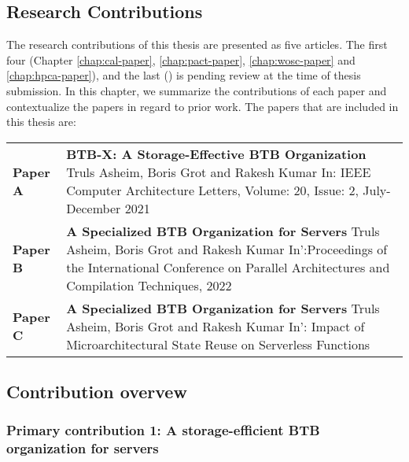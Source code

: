 \documentclass[../main.tex]{subfiles}
\begin{document}
\ifx\chapincluded\undefined
  \begin{refsection}
 \fi

\chapter{Research Contributions}

The research contributions of this thesis are presented as five articles. The first four (Chapter \ref{chap:cal-paper}, \ref{chap:pact-paper}, \ref{chap:wosc-paper} and \ref{chap:hpca-paper}), and the last () is pending review at the time of thesis submission. In this chapter, we summarize the contributions of each paper and contextualize the papers in regard to prior work. The papers that are included in this thesis are:

\vspace*{0.8cm}

\noindent
\begin{tabular}{lp{}}
\textbf{Paper A} & \textbf{BTB-X: A Storage-Effective BTB Organization} \newline
                     Truls Asheim, Boris Grot and Rakesh Kumar \newline
                     In: IEEE Computer Architecture Letters, Volume: 20, Issue: 2, July-December 2021
                     \vspace*{0.3cm} \\
\textbf{Paper B} & \textbf{A Specialized BTB Organization for Servers} \newline
                     Truls Asheim, Boris Grot and Rakesh Kumar \newline
                     In':Proceedings of the International Conference on Parallel Architectures and Compilation Techniques, 2022
                     \vspace*{0.3cm} \\
\textbf{Paper C} & \textbf{A Specialized BTB Organization for Servers} \newline
                     Truls Asheim, Boris Grot and Rakesh Kumar \newline
                     In': Impact of Microarchitectural State Reuse on Serverless Functions
                     \vspace*{0.3cm} \\

\end{tabular}


\section{Contribution overvew}

\subsection{Primary contribution 1: A storage-efficient BTB organization for servers}



\ifx\chapincluded\undefined
  \printbibliography
  \end{refsection}
 \fi
\end{document}
